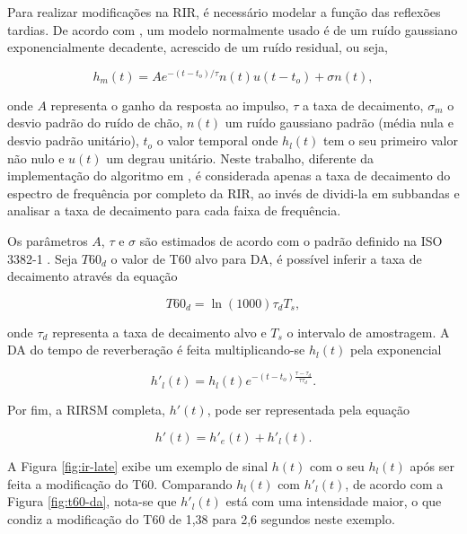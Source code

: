 Para realizar modificações na RIR, é necessário modelar a função das reflexões tardias. De acordo com \cite{RIR_Data_Aug},
um modelo normalmente usado é de um ruído gaussiano exponencialmente decadente, acrescido de um ruído residual, ou seja,

\begin{equation} \label{eqn:h_l-gauss}
    h_m(t) = A e^{-(t - t_o)/ \tau} n(t) u(t - t_o) + \sigma n(t)
    ,
\end{equation}

\noindent
onde $A$ representa o ganho da resposta ao impulso, $\tau$ a taxa de decaimento, $\sigma_m$ o desvio padrão do ruído de chão, 
$n(t)$ um ruído gaussiano padrão (média nula e desvio padrão unitário), $t_o$ o valor temporal onde $h_l(t)$
tem o seu primeiro valor não nulo e $u(t)$ um degrau unitário.
Neste trabalho, diferente da implementação do algoritmo em \cite{RIR_Data_Aug}, é considerada apenas a taxa de decaimento
do espectro de frequência por completo da RIR, ao invés de dividi-la em subbandas e analisar 
a taxa de decaimento para cada faixa de frequência.

Os parâmetros $A$, $\tau$ e $\sigma$ são estimados de acordo com o padrão definido na ISO 3382-1 \cite{ISO-3382}.
Seja $T60_d$ o valor de T60 alvo para DA, é possível inferir a taxa de decaimento através da equação

\begin{equation} \label{eqn:decay-rate-t60}
    T60_d = \ln(1000) \tau_d T_s
    ,
\end{equation}

\noindent
onde $\tau_d$ representa a taxa de decaimento alvo e $T_s$ o intervalo de amostragem.
A DA do tempo de reverberação é feita multiplicando-se $h_l(t)$ pela exponencial

\begin{equation} \label{eqn:DA-T60}
    h'_l(t) = h_l(t) e^{-(t - t_o) \frac{\tau - \tau_d}{ \tau \tau_d} }
    .
\end{equation}

Por fim, a RIRSM completa, $h'(t)$, pode ser representada pela equação

\begin{equation} \label{eqn:RIRSM}
    h'(t) = h'_e(t) + h'_l(t)
    .
\end{equation}

A Figura \ref{fig:ir-late} exibe um exemplo de sinal $h(t)$ com o seu $h_l(t)$ após ser feita a modificação do T60.
Comparando $h_l(t)$ com $h'_l(t)$, de acordo com a Figura \ref{fig:t60-da}, nota-se que $h'_l(t)$  está com uma intensidade 
maior, o que condiz a modificação do T60 de 1,38 para 2,6 segundos neste exemplo.

